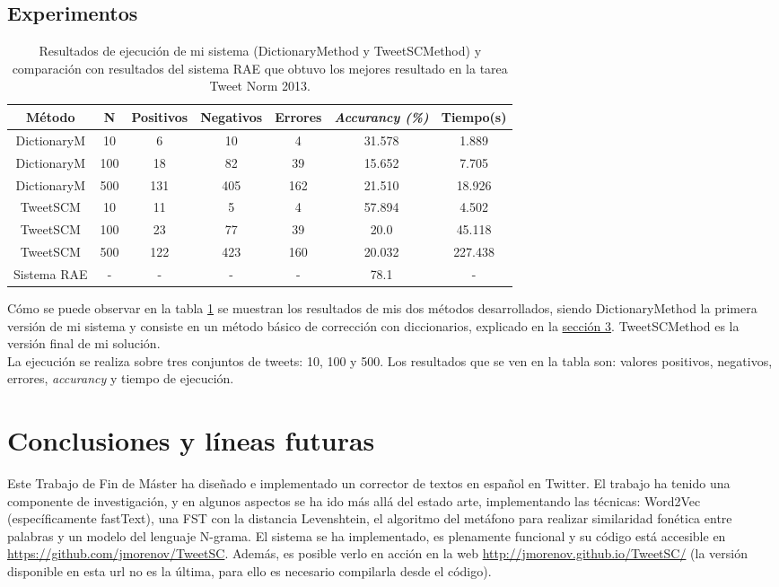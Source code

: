 \documentclass[spanish,12pt, a4paper,twoside]{paper}
\let\oldsection\section
\def\section{\cleardoublepage\oldsection}
\begin{document}
\subsection{Experimentos}\label{sec:experimentos}
\begin{table}[htb]
\centering
\begin{tabular}{|c|c|c|c|c|c|c|}
\hline 
\textbf{Método} & \textbf{N} & \textbf{Positivos} & \textbf{Negativos} & \textbf{Errores} & \textbf{\textit{Accurancy (\%)}} & \textbf{Tiempo(s)} \\ 
\hline 
DictionaryM & 10 & 6 & 10 & 4 & 31.578 & 1.889 \\ 
\hline 
DictionaryM & 100 & 18 & 82 & 39 & 15.652 & 7.705 \\ 
\hline 
DictionaryM & 500 & 131 & 405 & 162 & 21.510 & 18.926 \\ 
\hline 
TweetSCM & 10 & 11 & 5 & 4 & 57.894 & 4.502 \\ 
\hline 
TweetSCM & 100 & 23 & 77 & 39 & 20.0 & 45.118 \\ 
\hline 
TweetSCM & 500 & 122 & 423 & 160 & 20.032 & 227.438 \\ 
\hline 
Sistema RAE & - & - & - & - & 78.1 & - \\ 
\hline 
\end{tabular}
\caption{Resultados de ejecución de mi sistema (DictionaryMethod y TweetSCMethod) y comparación con resultados del sistema RAE \cite{porta:2013} que obtuvo los mejores resultado en la tarea Tweet Norm 2013\cite{alegria:2013}.}
\label{table:results}
\end{table}

Cómo se puede observar en la tabla \ref{table:results} se muestran los resultados de mis dos métodos desarrollados, siendo DictionaryMethod la primera versión de mi sistema y consiste en un método básico de corrección con diccionarios, explicado en la \hyperref[sec:solucionpropuesta]{sección 3}. TweetSCMethod es la versión final de mi solución.\\

La ejecución se realiza sobre tres conjuntos de tweets: 10, 100 y 500. Los resultados que se ven en la tabla son: valores positivos, negativos, errores, \textit{accurancy} y tiempo de ejecución.

\section{Conclusiones y líneas futuras}\label{sec:conclusiones}
Este Trabajo de Fin de Máster ha diseñado e implementado un corrector de textos en español en Twitter. El trabajo ha tenido una componente de investigación, y en algunos aspectos se ha ido más allá del estado arte, implementando las técnicas: Word2Vec (específicamente fastText), una FST con la distancia Levenshtein, el algoritmo del metáfono para realizar similaridad fonética entre palabras y un modelo del lenguaje N-grama. El sistema se ha implementado, es plenamente funcional y su código está accesible en \url{https://github.com/jmorenov/TweetSC}. Además, es posible verlo en acción en la web \url{http://jmorenov.github.io/TweetSC/} (la versión disponible en esta url no es la última, para ello es necesario compilarla desde el código).\\
\end{document}
